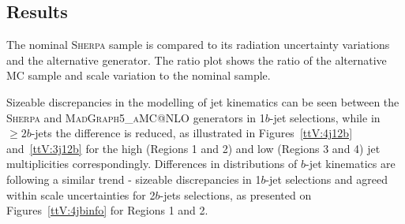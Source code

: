 



\subsection{Results}

The nominal  \textsc{Sherpa} \ttW  sample is compared to its radiation uncertainty variations and the alternative generator.
The ratio plot shows the ratio of the alternative MC sample and scale variation to the nominal sample.%

Sizeable discrepancies in the modelling of jet kinematics can be seen between the \textsc{Sherpa} \ttW and \textsc{MadGraph5\_aMC@NLO} generators in 1$b$-jet selections, while in $\geq2b$-jets the difference is reduced, as illustrated in Figures~\ref{ttV:4j12b} and~\ref{ttV:3j12b} for the high (Regions 1 and 2) and low (Regions 3 and 4) jet multiplicities correspondingly. 
Differences in distributions of $b$-jet kinematics are following a similar trend - sizeable discrepancies in 1$b$-jet selections and agreed within scale uncertainties for 2$b$-jets selections, as presented on Figures~\ref{ttV:4jbinfo} for Regions 1 and 2.


